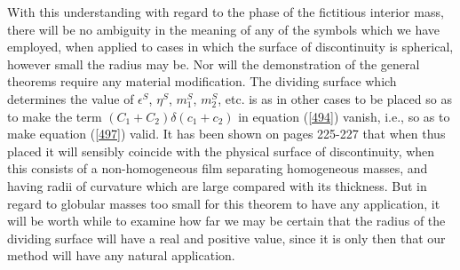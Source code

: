 \documentclass[12pt]{article}
\newcommand{\dd}{\delta}
\begin{document}
{With this understanding with regard to the phase of the fictitious interior mass, there will be no ambiguity in the meaning of any of the symbols which we have employed, when applied to cases in which the surface of discontinuity is spherical, however small the radius may be. Nor will the demonstration of the general theorems require any material modification. The dividing surface which determines the value of $\epsilon^S$, $\eta^S$, $m_1^S$, $m_2^S$, etc. is as in other cases to be placed so as to make the term $(C_1 + C_2) \dd (c_1 + c_2)$ in equation (\ref{494}) vanish, i.e., so as to make equation (\ref{497}) valid. It has been shown on pages 225-227 that when thus placed it will sensibly coincide with the physical surface of discontinuity, when this consists of a non-homogeneous film separating homogeneous masses, and having radii of curvature which are large compared with its thickness. But in regard to globular masses too small for this theorem to have any application, it will be worth while to examine how far we may be certain that the radius of the dividing surface will have a real and positive value, since it is only then that our method will have any natural application. 

}
\end{document}
